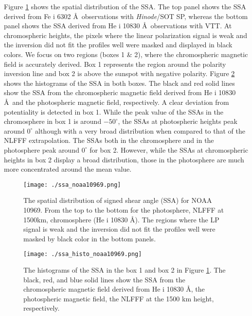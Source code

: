 \documentclass[manuscript]{aastex61}
\begin{document}
Figure \ref{sec3:ssa_noaa10969} shows the spatial distribution of the SSA.
The top panel shows the SSA derived from Fe {\sc i} 6302 \AA \ observations with {\it Hinode}/SOT SP, whereas the bottom panel shows the SSA derived from He {\sc i} 10830 \AA \ observations with VTT. 
At chromospheric heights, the pixels where the linear polarization signal is weak
and the inversion did not fit the profiles well were masked and displayed in black colors. 
We focus on two regions (boxes 1 \& 2), where the chromospheric magnetic field is accurately derived. Box 1 
represents the region around the polarity inversion line and box 2 is above the 
sunspot with negative polarity. Figure \ref{sec3:ssa_histo_noaa10969} shows the
histograms of the SSA in both boxes. The black and red solid lines show the SSA from the
chromospheric magnetic field derived from He {\sc i} 10830 \AA \ and the
photospheric magnetic field, respectively. A clear deviation from potentiality is 
detected in box 1. While the peak value of the SSAs in the chromosphere in box 1 is around $-50^\circ$,
the SSAs at photospheric heights peak around $0^\circ$ although
with a very broad distribution when compared to that of the NLFFF extrapolation. The SSAs both in the
chromosphere and in the photosphere peak around $0^\circ$ for box 2. However,
while the SSAs at chromospheric heights in box 2 display a broad distribution, those
in the photosphere are much more concentrated around the mean value. 

\begin{figure}
\begin{center}
\texttt{[image: ./ssa\_noaa10969.png]}
\end{center}
\caption{The spatial distribution of signed shear angle (SSA) for NOAA 10969. From the top to the bottom for the photosphere, NLFFF at 1500km, chromosphere (He {\sc i} 10830 \AA). The regions where the LP signal is weak and the inversion did not fit the profiles well were masked by black color in the bottom panels. }
\label{sec3:ssa_noaa10969}
\end{figure}

\begin{figure}
\texttt{[image: ./ssa\_histo\_noaa10969.png]}
\caption{The histograms of the SSA in the box 1 and box 2 in Figure \ref{sec3:ssa_noaa10969}. The black, red, and blue solid lines show the SSA from the chromospheric magnetic field derived from He {\sc i} 10830 \AA, the photospheric magnetic field, the NLFFF at the 1500 km height, respectively.}
\label{sec3:ssa_histo_noaa10969}
\end{figure}
\end{document}
